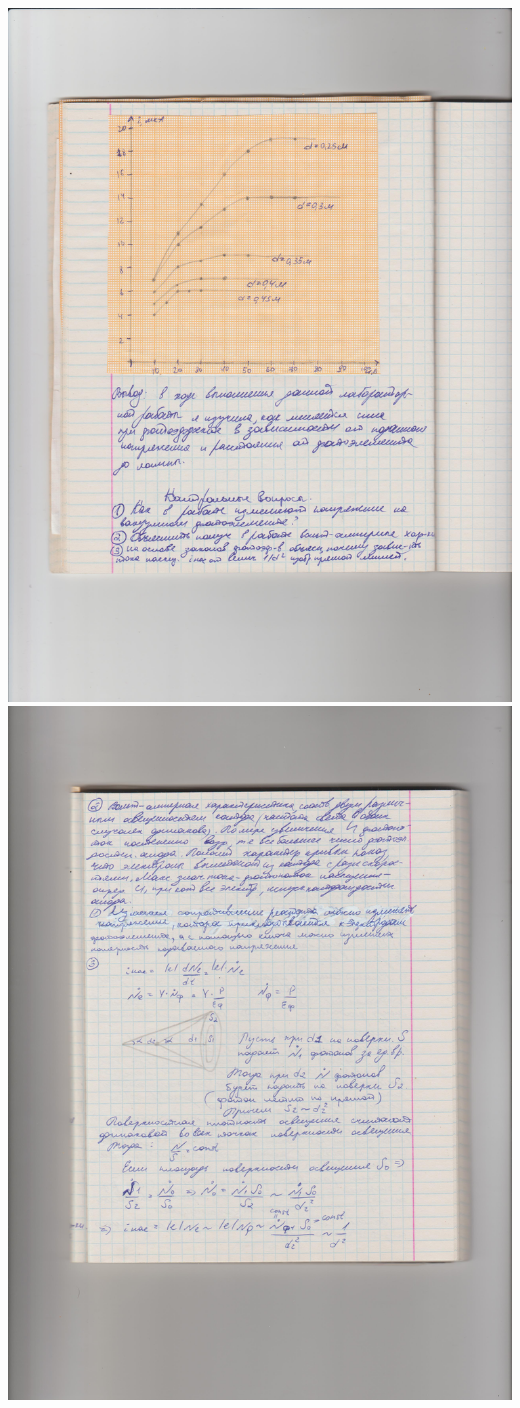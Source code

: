 \documentclass[12pt]{article}
\begin{document}
\includegraphics {122_8.jpeg}\\
\includegraphics {122_9.jpeg}
\end{document}
